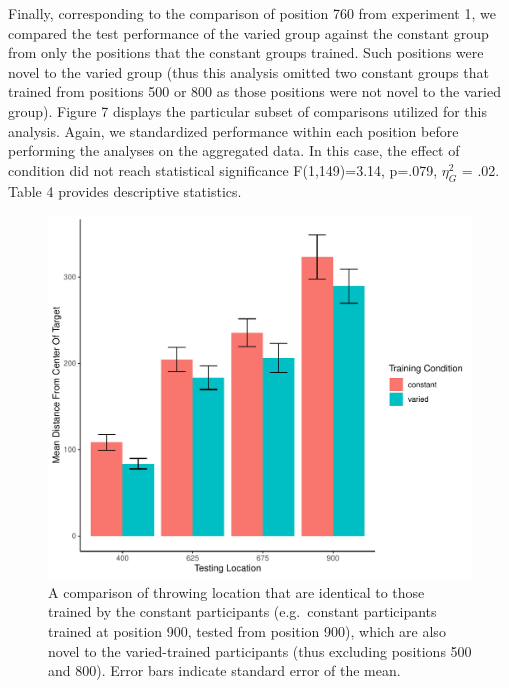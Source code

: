 \documentclass[
  jou, donotrepeattitle,floatsintext]{apa7}
\begin{document}
Finally, corresponding to the comparison of position 760 from experiment 1, we compared the test performance of the varied group against the constant group from only the positions that the constant groups trained. Such positions were novel to the varied group (thus this analysis omitted two constant groups that trained from positions 500 or 800 as those positions were not novel to the varied group). Figure 7 displays the particular subset of comparisons utilized for this analysis. Again, we standardized performance within each position before performing the analyses on the aggregated data. In this case, the effect of condition did not reach statistical significance F(1,149)=3.14, p=.079, \(\eta^{2}_G\) = .02. Table 4 provides descriptive statistics.



\begin{figure}
\centering
\includegraphics{IGAS_PJ_files/figure-latex/e2test2-1.pdf}
\caption{\label{fig:e2test2}A comparison of throwing location that are identical to those trained by the constant participants (e.g.~constant participants trained at position 900, tested from position 900), which are also novel to the varied-trained participants (thus excluding positions 500 and 800). Error bars indicate standard error of the mean.}
\end{figure}
\end{document}
